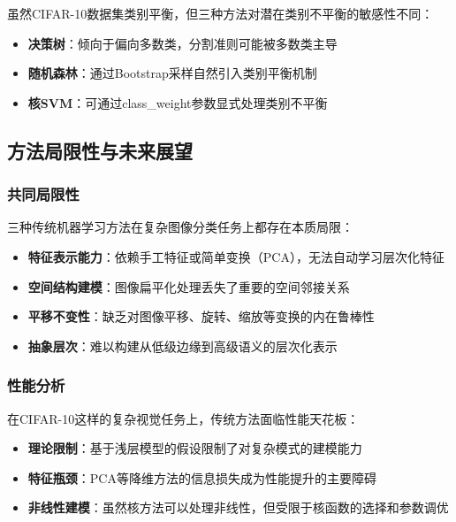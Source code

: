 \documentclass[UTF8]{report}
\theoremstyle{MyLineTheoremStyle} %
\theoremstyle{MyBlockTheoremStyle} %
\theoremstyle{MySubsubsectionStyle} %
\begin{document}
虽然CIFAR-10数据集类别平衡，但三种方法对潜在类别不平衡的敏感性不同：

\begin{itemize}
    \item \textbf{决策树}：倾向于偏向多数类，分割准则可能被多数类主导
    \item \textbf{随机森林}：通过Bootstrap采样自然引入类别平衡机制
    \item \textbf{核SVM}：可通过class\_weight参数显式处理类别不平衡
\end{itemize}



\subsection{方法局限性与未来展望}

\subsubsection{共同局限性}

三种传统机器学习方法在复杂图像分类任务上都存在本质局限：

\begin{itemize}
    \item \textbf{特征表示能力}：依赖手工特征或简单变换（PCA），无法自动学习层次化特征
    \item \textbf{空间结构建模}：图像扁平化处理丢失了重要的空间邻接关系
    \item \textbf{平移不变性}：缺乏对图像平移、旋转、缩放等变换的内在鲁棒性
    \item \textbf{抽象层次}：难以构建从低级边缘到高级语义的层次化表示
\end{itemize}

\subsubsection{性能分析}

在CIFAR-10这样的复杂视觉任务上，传统方法面临性能天花板：

\begin{itemize}
    \item \textbf{理论限制}：基于浅层模型的假设限制了对复杂模式的建模能力
    \item \textbf{特征瓶颈}：PCA等降维方法的信息损失成为性能提升的主要障碍
    \item \textbf{非线性建模}：虽然核方法可以处理非线性，但受限于核函数的选择和参数调优
\end{itemize}
\end{document}
